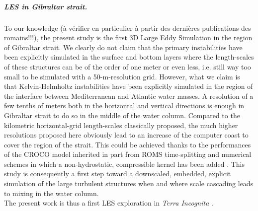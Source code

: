 \color{blue} \subparagraph{LES in Gibraltar strait.} To our knowledge (à vérifier en particulier à partir des dernières publications des romains!!!), the present study is the first 3D Large Eddy Simulation in the region of Gibraltar strait. We clearly do not claim that the primary instabilities have been explicitly simulated in the surface and bottom layers where the length-scales of these structures can be of the order of one meter or even less, i.e. still way too small to be simulated with a 50-m-resolution grid. However, what we claim is that Kelvin-Helmholtz instabilities have been explicitly simulated in the region of the interface between Mediterranean and Atlantic water masses. A resolution of a few tenths of meters both in the horizontal and vertical directions is enough in Gibraltar strait to do so in the middle of the water column. Compared to the kilometric horizontal-grid length-scales classically proposed, the much higher resolutions proposed here obviously lead to an increase of the computer coast to cover the region of the strait. This could be achieved thanks to the performances of the CROCO model inherited in part from ROMS time-splitting and numerical schemes \citep{shchepetkin_regional_2005} in which a non-hydrostatic, compressible kernel has been added \citep{auclair_non-hydrostatic_2018, hilt_numerical_2020}. This study is consequently a first step toward a downscaled, embedded, explicit simulation of the large turbulent structures when and where scale cascading leads to mixing in the water column.\\
The present work is thus a first LES exploration in \textit{Terra Incognita} \citep{scotti_large_2010, wyngaard_toward_2004}.\color{black}
\color{black}
